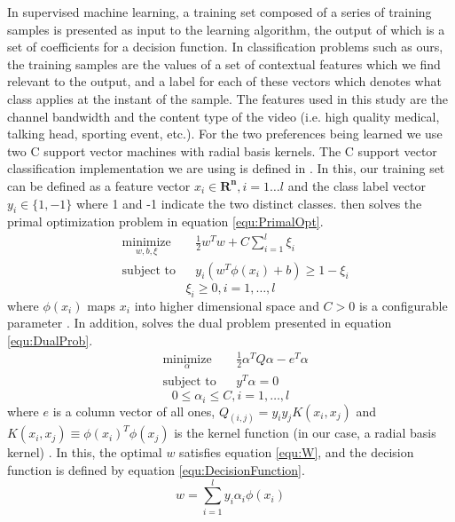 \documentclass[a4paper,12pt]{article}
\begin{document}
In supervised machine learning, a training set composed of a series of training samples is presented as input to the learning algorithm, the output of which is a set of coefficients for a decision function. In classification problems such as ours, the training samples are the values of a set of contextual features which we find relevant to the output, and a label for each of these vectors which denotes what class applies at the instant of the sample. The features used in this study are the channel bandwidth and the content type of the video (i.e. high quality medical, talking head, sporting event, etc.). For the two preferences being learned we use two C support vector machines with radial basis kernels. The C support vector classification implementation we are using is defined in \cite{LibSVM}. In this, our training set can be defined as a feature vector $x_i \in \mathbf{R^n}  ,i=1\ldots{l}$ and the class label vector $y_i \in \lbrace 1,-1 \rbrace $ where 1 and -1 indicate the two distinct classes. \cite{LibSVM} then solves the primal optimization problem in equation \ref{equ:PrimalOpt}. 
\begin{equation}
\begin{aligned}
\label{equ:PrimalOpt}
& \underset{w,b,\xi}{\text{minimize}}
& & \frac{1}{2}w^Tw+C\sum_{i=1}^{l} \xi_i \\
& \text{subject to}
& &  y_i(w^T\phi(x_i) + b) \ge 1 - \xi_i
\end{aligned}
\end{equation}
\[ \xi_i \ge 0, i = 1,\ldots ,l \]
where $\phi (x_i)$ maps $x_i$ into higher dimensional space and $C > 0$ is a configurable parameter \cite{LibSVM}. In addition, \cite{LibSVM} solves the dual problem presented in equation \ref{equ:DualProb}.
\begin{equation}
\begin{aligned}
\label{equ:DualProb}
& \underset{\alpha}{\text{minimize}}
& & \frac{1}{2}\alpha^TQ\alpha-e^T\alpha \\
& \text{subject to}
& &  y^T\alpha = 0
\end{aligned}
\end{equation}
\[ 0 \le \alpha_i \le C, i = 1,\ldots ,l \]
where $e$ is a column vector of all ones, $Q_(i,j)=y_i y_j K(x_i,x_j)$ and $K(x_i,x_j ) \equiv \phi (x_i )^T \phi (x_j)$ is the kernel function (in our case, a radial basis kernel) \cite{LibSVM}. In this, the optimal $w$ satisfies equation \ref{equ:W}, and the decision function is defined by equation \ref{equ:DecisionFunction}.
\begin{equation}
\label{equ:W}
w = \sum_{i=1}^{l} y_i \alpha_i \phi (x_i)
\end{equation}
\end{document}
